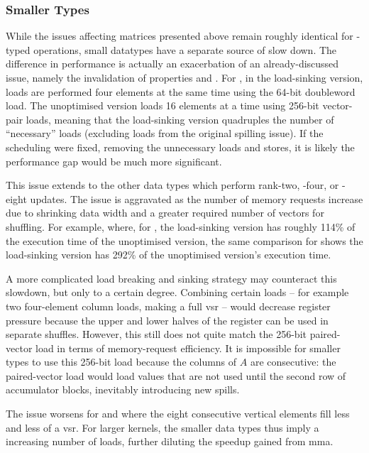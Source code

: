 \documentclass[\main/thesis.tex]{subfiles}
\begin{document}
\subsubsection{Smaller Types}
While the issues affecting  matrices presented above remain roughly identical for -typed operations, small datatypes have a separate source of slow down.
The difference in performance is actually an exacerbation of an already-discussed issue, namely the invalidation of properties  and .
For , in the load-sinking version, loads are performed four  elements at the same time using the 64-bit doubleword load.
The unoptimised version loads 16 elements at a time using 256-bit vector-pair loads, meaning that the load-sinking version quadruples the number of ``necessary'' loads (excluding loads from the original spilling issue).
If the scheduling were fixed, removing the unnecessary loads and stores, it is likely the performance gap would be much more significant.

This issue extends to the other data types which perform rank-two, -four, or -eight updates.
The issue is aggravated as the number of memory requests increase due to shrinking data width and a greater required number of vectors for shuffling.
For example, where, for , the load-sinking version has roughly 114\% of the execution time of the unoptimised version, the same comparison for  shows the load-sinking version has 292\% of the unoptimised version's execution time.

A more complicated load breaking and sinking strategy may counteract this slowdown, but only to a certain degree.
Combining certain loads -- for example two four-element  column loads, making a full \gls{vsr} -- would decrease register pressure because the upper and lower halves of the register can be used in separate shuffles.
However, this still does not quite match the 256-bit paired-vector load in terms of memory-request efficiency.
It is impossible for smaller types to use this 256-bit load because the columns of $A$ are consecutive: the paired-vector load would load values that are not used until the second row of accumulator blocks, inevitably introducing new spills.

The issue worsens for  and  where the eight consecutive vertical elements fill less and less of a \gls{vsr}.
For larger kernels, the smaller data types thus imply a increasing number of loads, further diluting the speedup gained from \gls{mma}.
\end{document}
